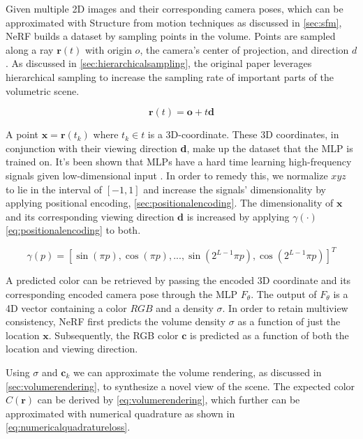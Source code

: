 Given multiple 2D images and their corresponding camera poses, which can be approximated with Structure from motion techniques as discussed in \autoref{sec:sfm}, NeRF builds a dataset by sampling points in the volume. Points are sampled along a ray $\pmb{r}(t)$ with origin $o$, the camera's center of projection, and direction $d$. As discussed in \autoref{sec:hierarchicalsampling}, the original paper leverages hierarchical sampling to increase the sampling rate of important parts of the volumetric scene.


\begin{equation}
    \pmb{r}(t) = \pmb{o} + t\pmb{d}
    \label{eq:rayfunction}
\end{equation}


A point $\pmb{x} = \pmb{r}(t_k)$ where $t_k \in t$ is a 3D-coordinate. These 3D coordinates, in conjunction with their viewing direction \textbf{d}, make up the dataset that the MLP is trained on. It's been shown that MLPs have a hard time learning high-frequency signals given low-dimensional input \cite{tancik_fourier_2020}. In order to remedy this, we normalize $xyz$ to lie in the interval of $[-1, 1]$ and increase the signals' dimensionality by applying positional encoding, \autoref{sec:positionalencoding}. The dimensionality of $\pmb{x}$ and its corresponding viewing direction $\pmb{d}$ is increased by applying $\gamma(\cdot)$ \autoref{eq:positionalencoding} to both.

\begin{equation}
    \gamma(p) = [\sin(\pi p), \cos(\pi p), ..., \sin(2^{L-1}\pi p), \cos(2^{L-1}\pi p)]^T
    \label{eq:positionalencoding}
\end{equation}

A predicted color can be retrieved by passing the encoded 3D coordinate and its corresponding encoded camera pose through the MLP $F_{\theta}$. The output of $F_\theta$ is a 4D vector containing a color $RGB$ and a density $\sigma$. In order to retain multiview consistency, NeRF first predicts the volume density $\sigma$ as a function of just the location $\textbf{x}$. Subsequently, the RGB color $\pmb{c}$ is predicted as a function of both the location and viewing direction.


Using $\sigma$ and $\pmb{c}_k$ we can approximate the volume rendering, as discussed in \autoref{sec:volumerendering}, to synthesize a novel view of the scene. The expected color $C(\pmb{r})$ can be derived by \autoref{eq:volumerendering}, which further can be approximated with numerical quadrature as shown in \autoref{eq:numericalquadratureloss}.

